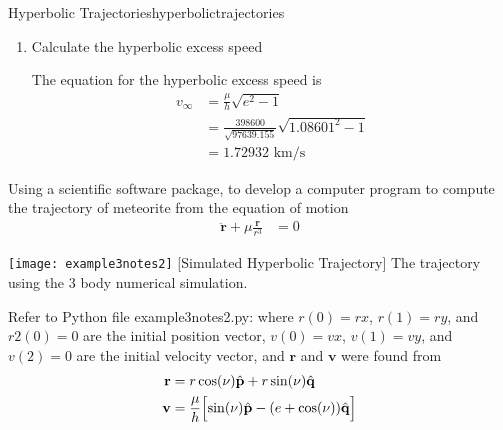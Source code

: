 \begin{examples}{Hyperbolic Trajectories}{hyperbolictrajectories}
\begin{enumerate}[label = (\alph*)]
  \item
    Calculate the hyperbolic excess speed
    \par\smallskip
    The equation for the hyperbolic excess speed is
    \begin{align*} 
      v_{\infty} & = \frac{\mu}{h}\sqrt{e^2 - 1}\\
                 & = \frac{398600}{\sqrt{97639.155}}\sqrt{1.08601^2 - 1}\\
                 & = 1.72932\text{ km}/\text{s}
    \end{align*}
  \end{enumerate}
  Using a scientific software package, to develop a computer program to
  compute the trajectory of meteorite from the equation of motion
  \begin{align*} 
    \ddot{\mathbf{r}} + \mu\frac{\mathbf{r}}{r^3} & = 0
  \end{align*}
  \par\smallskip
  \begin{minipage}{\linewidth}
    \centering
    \texttt{[image: example3notes2]}
    [Simulated Hyperbolic Trajectory]
    {The trajectory using the 3 body numerical simulation.}
    \label{numsimulationhyperbolic}
  \end{minipage}
  \par\smallskip
  Refer to Python file example3notes2.py: where \(r(0) = rx\), \(r(1) = ry\),
  and \(r2(0) = 0\) are the initial position vector, \(v(0) = vx\),
  \(v(1) = vy\), and\(v(2) = 0\) are the initial velocity vector, and
  \(\mathbf{r}\) and \(\mathbf{v}\) were found from
  \begin{align*} 
    \mathbf{r} & = r\cos(\nu)\hat{\mathbf{p}} + r\sin(\nu)\hat{\mathbf{q}}\\
    \mathbf{v} & = \frac{\mu}{h}\Bigl[\sin(\nu)\hat{\mathbf{p}} - (e
                 + \cos(\nu))\hat{\mathbf{q}}\Bigr]
  \end{align*}
\end{examples}
